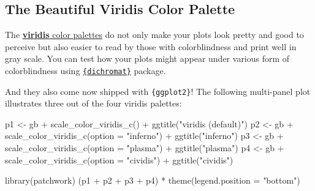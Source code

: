 \documentclass[
  letterpaper,
]{scrbook}
\newenvironment{Shaded}{\begin{snugshade}}{\end{snugshade}}
\newcommand{\AttributeTok}[1]{\textcolor[rgb]{0.40,0.45,0.13}{#1}}
\newcommand{\FunctionTok}[1]{\textcolor[rgb]{0.28,0.35,0.67}{#1}}
\newcommand{\NormalTok}[1]{\textcolor[rgb]{0.00,0.23,0.31}{#1}}
\newcommand{\OtherTok}[1]{\textcolor[rgb]{0.00,0.23,0.31}{#1}}
\newcommand{\SpecialCharTok}[1]{\textcolor[rgb]{0.37,0.37,0.37}{#1}}
\newcommand{\StringTok}[1]{\textcolor[rgb]{0.13,0.47,0.30}{#1}}
\begin{document}
\subsection{The Beautiful Viridis Color
Palette}\label{the-beautiful-viridis-color-palette}

The
\href{https://sjmgarnier.github.io/viridis/articles/intro-to-viridis.html}{\textbf{viridis}
color palettes} do not only make your plots look pretty and good to
perceive but also easier to read by those with colorblindness and print
well in gray scale. You can test how your plots might appear under
various form of colorblindness using
\href{https://cran.r-project.org/web/packages/dichromat/index.html}{\texttt{\{dichromat\}}}
package.

And they also come now shipped with \texttt{\{ggplot2\}}! The following
multi-panel plot illustrates three out of the four viridis palettes:

\begin{Shaded}
\begin{Highlighting}[]
\NormalTok{p1 }\OtherTok{\textless{}{-}}\NormalTok{ gb }\SpecialCharTok{+} \FunctionTok{scale\_color\_viridis\_c}\NormalTok{() }\SpecialCharTok{+} \FunctionTok{ggtitle}\NormalTok{(}\StringTok{"\textquotesingle{}viridis\textquotesingle{} (default)"}\NormalTok{)}
\NormalTok{p2 }\OtherTok{\textless{}{-}}\NormalTok{ gb }\SpecialCharTok{+} \FunctionTok{scale\_color\_viridis\_c}\NormalTok{(}\AttributeTok{option =} \StringTok{"inferno"}\NormalTok{) }\SpecialCharTok{+} \FunctionTok{ggtitle}\NormalTok{(}\StringTok{"\textquotesingle{}inferno\textquotesingle{}"}\NormalTok{)}
\NormalTok{p3 }\OtherTok{\textless{}{-}}\NormalTok{ gb }\SpecialCharTok{+} \FunctionTok{scale\_color\_viridis\_c}\NormalTok{(}\AttributeTok{option =} \StringTok{"plasma"}\NormalTok{) }\SpecialCharTok{+} \FunctionTok{ggtitle}\NormalTok{(}\StringTok{"\textquotesingle{}plasma\textquotesingle{}"}\NormalTok{)}
\NormalTok{p4 }\OtherTok{\textless{}{-}}\NormalTok{ gb }\SpecialCharTok{+} \FunctionTok{scale\_color\_viridis\_c}\NormalTok{(}\AttributeTok{option =} \StringTok{"cividis"}\NormalTok{) }\SpecialCharTok{+} \FunctionTok{ggtitle}\NormalTok{(}\StringTok{"\textquotesingle{}cividis\textquotesingle{}"}\NormalTok{)}

\FunctionTok{library}\NormalTok{(patchwork)}
\NormalTok{(p1 }\SpecialCharTok{+}\NormalTok{ p2 }\SpecialCharTok{+}\NormalTok{ p3 }\SpecialCharTok{+}\NormalTok{ p4) }\SpecialCharTok{*} \FunctionTok{theme}\NormalTok{(}\AttributeTok{legend.position =} \StringTok{"bottom"}\NormalTok{)}
\end{Highlighting}
\end{Shaded}
\end{document}

